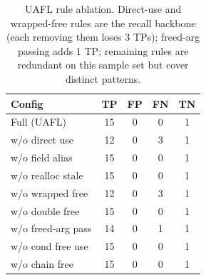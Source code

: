 \begin{table}[t]
\centering
\small
\begin{tabular}{lcccc}
\toprule
Config & TP & FP & FN & TN \\
\midrule
  Full (UAFL) & 15 & 0 & 0 & 1 \\
  w/o direct use & 12 & 0 & 3 & 1 \\
  w/o field alias & 15 & 0 & 0 & 1 \\
  w/o realloc stale & 15 & 0 & 0 & 1 \\
  w/o wrapped free & 12 & 0 & 3 & 1 \\
  w/o double free & 15 & 0 & 0 & 1 \\
  w/o freed-arg pass & 14 & 0 & 1 & 1 \\
  w/o cond free use & 15 & 0 & 0 & 1 \\
  w/o chain free & 15 & 0 & 0 & 1 \\
\bottomrule
\end{tabular}
\caption{UAFL rule ablation. Direct-use and wrapped-free rules are the
recall backbone (each removing them loses 3 TPs); freed-arg passing
adds 1 TP; remaining rules are redundant on this sample set but cover
distinct patterns.}
\label{tab:uaf_ablation}
\end{table}
